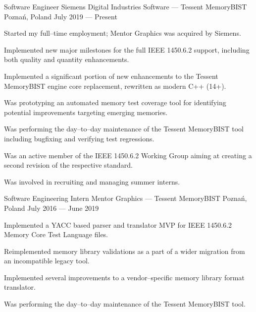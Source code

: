 \documentclass[11pt, a4paper]{awesome-cv}
\begin{document}
\begin{cventries}
  \cventry
    {Software Engineer} %
    {Siemens Digital Industries Software --- Tessent MemoryBIST} %
    {Poznań, Poland} %
    {July 2019 --- Present} %
    {
      \begin{cvitems} %
      \item {Started my full--time employment; Mentor Graphics was acquired by Siemens.}
      \item {Implemented new major milestones for the full IEEE 1450.6.2 support, including both quality and quantity enhancements.}
      \item {Implemented a significant portion of new enhancements to the Tessent MemoryBIST engine core replacement, rewritten as modern C++ (14+).}
      \item {Was prototyping an automated memory test coverage tool for identifying potential improvements targeting emerging memories.}
      \item {Was performing the day--to--day maintenance of the Tessent MemoryBIST tool including bugfixing and verifying test regressions.}
      \item {Was an active member of the IEEE 1450.6.2 Working Group aiming at creating a second revision of the respective standard.}
      \item {Was involved in recruiting and managing summer interns.}
      \end{cvitems}
    }

  \cventry
    {Software Engineering Intern} %
    {Mentor Graphics --- Tessent MemoryBIST} %
    {Poznań, Poland} %
    {July 2016 --- June 2019} %
    {
      \begin{cvitems} %
      \item {Implemented a YACC based parser and translator MVP for IEEE 1450.6.2 Memory Core Test Language files.}
      \item {Reimplemented memory library validations as a part of a wider migration from an incompatible legacy tool.}
      \item {Implemented several improvements to a vendor--specific memory library format translator.}
      \item {Was performing the day--to--day maintenance of the Tessent MemoryBIST tool.}
      \end{cvitems}
    }


\end{cventries}
\end{document}
